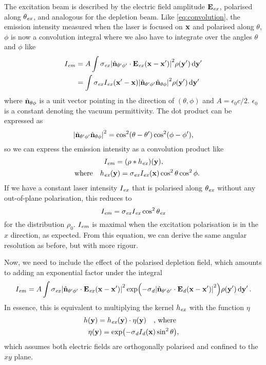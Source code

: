 The excitation beam is described by the electric field amplitude $ \vb{E}_{\mathit{ex}} $, polarised along $ \theta_{\mathit{ex}} $, and analogous for the depletion beam. Like \autoref{eq:convolution}, the emission intensity measured when the laser is focused on $ \vb{x} $ and polarised along $ \theta $, $ \phi$ is now a convolution integral where we also have to integrate over the angles $ \theta $ and $ \phi $ like
\begin{equation}
	\begin{aligned}
		I_{\mathit{em}} 
			&= A \int 
				\sigma_{\mathit{ex}} \abs{\hat{\vb{n}}_{\theta'\phi'} \cdot \vb{E}_{\mathit{ex}}(\vb{x}-\vb{x}')}^2 
				\rho(\vb{y}') 
				\dd{\vb{y}'} \\
			&= \int 
				\sigma_{\mathit{ex}} I_{\mathit{ex}}(\vb{x}'-\vb{x}) \abs{\hat{\vb{n}}_{\theta'\phi'}\hat{\vb{n}}_{\theta\phi}}^2
				\rho(\vb{y}') 
				\dd{\vb{y}'}
	\end{aligned}
\end{equation}
where $ \hat{\vb{n}}_{\theta\phi} $ is a unit vector pointing in the direction of $ (\theta, \phi) $ and $ A = \epsilon_0c/2 $. $ \epsilon_0 $ is a constant denoting the vacuum permittivity. The dot product can be expressed as
\begin{equation}
	\abs{\hat{\vb{n}}_{\theta'\phi'}\hat{\vb{n}}_{\theta\phi}}^2 = \cos^2(\theta-\theta') \cos^2(\phi-\phi'),
\end{equation}
so we can express the emission intensity as a convolution product like
\begin{gather}
	I_\emm = (\rho*h_\exc)(\vb{y}), \\
	\qq{where} h_\exc(\vb{y}) = \sigma_\exc I_\exc(\vb{x}) \cos^2\theta\cos^2\phi.
\end{gather}
If we have a constant laser intensity $ I_{\mathit{ex}} $ that is polarised along $ \theta_{\mathit{ex}} $ without any out-of-plane polarisation, this reduces to
\begin{equation}
	I_{\mathit{em}} = \sigma_{\mathit{ex}} I_{\mathit{ex}} \cos^2\theta_{\mathit{ex}}
\end{equation}
for the distribution $ \rho_0 $. $ I_{\mathit{em}} $ is maximal when the excitation polarisation is in the $ x $ direction, as expected. From this equation, we can derive the same angular resolution as before, but with more rigour.

Now, we need to include the effect of the polarised depletion field, which amounts to adding an exponential factor under the integral
\begin{multline}
	I_{\mathit{em}} = A \int
		\sigma_{\mathit{ex}} \abs{\hat{\vb{n}}_{\theta'\phi'} \cdot \vb{E}_{\mathit{ex}}(\vb{x}-\vb{x}')}^2 
		\exp(-\sigma_{\mathit{d}} \abs{\hat{\vb{n}}_{\theta'\phi'} \cdot \vb{E}_{\mathit{d}}(\vb{x}-\vb{x}')}^2)
		\rho(\vb{y}') 
		\dd{\vb{y}'}.
	\label{eq:psted integral}
\end{multline}
In essence, this is equivalent to multiplying the kernel $ h_{\mathit{ex}} $ with the function $ \eta $
\begin{gather}
	h(\vb{y}) = h_\exc(\vb{y}) \cdot \eta(\vb{y})  \qq{, where} \\
	\eta(\vb{y}) = \exp(-\sigma_\dep I_\dep(\vb{x}) \sin^2 \theta),
\end{gather}
which assumes both electric fields are orthogonally polarised and confined to the $ xy $ plane.

